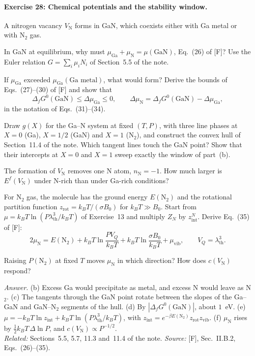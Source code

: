 \documentclass[11pt]{article}      %
\numberwithin{equation}{section}   %
\begin{document}
\paragraph{Exercise 28: Chemical potentials and the stability window.}
A nitrogen vacancy $V_{\text{N}}$ forms in GaN, which coexists either with Ga metal or with N$_2$ gas.
\begin{parts}
    \item In GaN at equilibrium, why must $\mu_{\text{Ga}} + \mu_{\text{N}} = \mu(\text{GaN})$, Eq.~(26) of [F]? Use the Euler relation $G = \sum_i\mu_iN_i$ of Section~5.5 of the note.
    \item If $\mu_{\text{Ga}}$ exceeded $\mu_{\text{Ga}}(\text{Ga metal})$, what would form? Derive the bounds of Eqs.~(27)--(30) of [F] and show that
    \begin{equation*}
        \Delta_fG^0(\text{GaN}) \le \Delta\mu_{\text{Ga}} \le 0,\qquad \Delta\mu_{\text{N}} = \Delta_fG^0(\text{GaN}) - \Delta\mu_{\text{Ga}},
    \end{equation*}
    in the notation of Eqs.~(31)--(34).
    \item Draw $g(X)$ for the Ga--N system at fixed $(T, P)$, with three line phases at $X = 0$ (Ga), $X = 1/2$ (GaN) and $X = 1$ (N$_2$), and construct the convex hull of Section~11.4 of the note. Which tangent lines touch the GaN point? Show that their intercepts at $X = 0$ and $X = 1$ sweep exactly the window of part~(b).
    \item The formation of $V_{\text{N}}$ removes one N atom, $n_{\text{N}} = -1$. How much larger is $E^f(V_{\text{N}})$ under N-rich than under Ga-rich conditions?
    \item For N$_2$ gas, the molecule has the ground energy $E(\text{N}_2)$ and the rotational partition function $z_{\text{rot}} = k_BT/(\sigma B_0)$ for $k_BT \gg B_0$. Start from $\mu = k_BT\ln(P\lambda_{\text{th}}^3/k_BT)$ of Exercise~13 and multiply $Z_N$ by $z_{\text{int}}^N$. Derive Eq.~(35) of [F]:
    \begin{equation*}
        2\mu_{\text{N}} = E(\text{N}_2) + k_BT\ln\frac{PV_Q}{k_BT} + k_BT\ln\frac{\sigma B_0}{k_BT} + \mu_{\text{vib}},\qquad V_Q = \lambda_{\text{th}}^3.
    \end{equation*}
    \item Raising $P(\text{N}_2)$ at fixed $T$ moves $\mu_{\text{N}}$ in which direction? How does $c(V_{\text{N}})$ respond?
\end{parts}
\textit{Answer.} (b) Excess Ga would precipitate as metal, and excess N would leave as N$_2$. (c) The tangents through the GaN point rotate between the slopes of the Ga--GaN and GaN--N$_2$ segments of the hull. (d) By $|\Delta_fG^0(\text{GaN})|$, about $1$~eV. (e) $\mu = -k_BT\ln z_{\text{int}} + k_BT\ln(P\lambda_{\text{th}}^3/k_BT)$, with $z_{\text{int}} = e^{-\beta E(\text{N}_2)}z_{\text{rot}}z_{\text{vib}}$. (f) $\mu_{\text{N}}$ rises by $\tfrac12k_BT\,\Delta\ln P$, and $c(V_{\text{N}}) \propto P^{-1/2}$.\\
\textit{Related:} Sections~5.5, 5.7, 11.3 and~11.4 of the note. \textit{Source:} [F], Sec.~II.B.2, Eqs.~(26)--(35).
\end{document}
